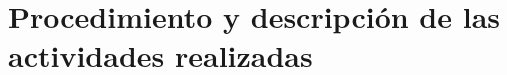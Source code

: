 \chapter{Procedimiento y descripción de las actividades realizadas}
    
    \newpage
    
    \newpage
    